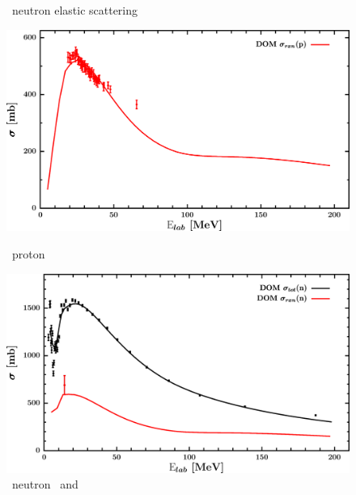 \begin{figure}[hbtp]
\begin{minipage}{0.47\textwidth}
        \caption*{\oSix\ neutron elastic scattering}
        \label{DOMFitData_o16_neutron_elastic}
    \end{minipage}
\end{figure}
\vspace{0.70in}
\begin{figure}[hbtp]
    \centering
    \begin{minipage}{0.47\textwidth}
        \centering
        \includegraphics[width=\linewidth]{figures/o16_protonInelastic.png}
        \caption*{\oSix\ proton \rxn}
        \label{DOMFitData_o16_proton_inelastic}
    \end{minipage}\hspace{6pt}
    \begin{minipage}{0.47\textwidth}
        \centering
        \includegraphics[width=\textwidth]{figures/o16_neutronInelastic.png}
        \caption*{\oSix\ neutron \rxn\ and \tot}
        \label{DOMFitData_o16_neutron_inelastic}
    \end{minipage}
\end{figure}
\afterpage{\clearpage}
